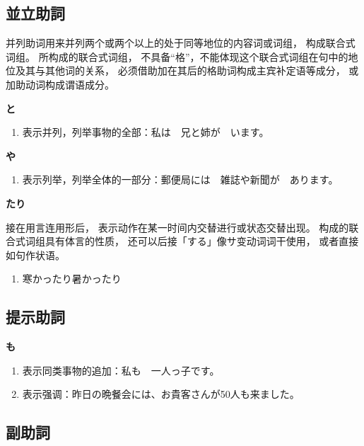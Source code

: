 \subsection{並立助詞}%

并列助词用来并列两个或两个以上的处于同等地位的内容词或词组，
构成联合式词组。
所构成的联合式词组，
不具备``格''，不能体现这个联合式词组在句中的地位及其与其他词的关系，
必须借助加在其后的格助词构成主宾补定语等成分，
或加助动词构成谓语成分。


{\bf
\noindent と
}

\begin{enumerate}
  \item 表示并列，列举事物的全部：私は　兄と姉が　います。
\end{enumerate}


{\bf
\noindent や
}

\begin{enumerate}
  \item 表示列举，列举全体的一部分：郵便局には　雑誌や新聞が　あります。
\end{enumerate}


{\bf
\noindent たり
}

接在用言连用形后，
表示动作在某一时间内交替进行或状态交替出现。
构成的联合式词组具有体言的性质，
还可以后接「する」像サ变动词词干使用，
或者直接如句作状语。

\begin{enumerate}
  \item 寒かったり暑かったり
\end{enumerate}


\subsection{提示助詞}%

{\bf
\noindent も
}

\begin{enumerate}
  \item 表示同类事物的追加：私も　一人っ子です。
  \item 表示强调：昨日の晩餐会には、お貴客さんが50人も来ました。
\end{enumerate}


\subsection{副助詞}%

